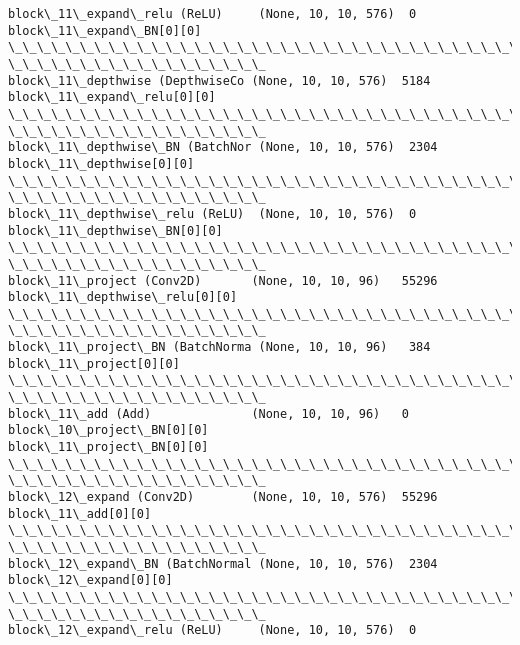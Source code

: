 \documentclass[11pt]{article}
\begin{document}
\begin{Verbatim}[commandchars=\\\{\}]
block\_11\_expand\_relu (ReLU)     (None, 10, 10, 576)  0
block\_11\_expand\_BN[0][0]
\_\_\_\_\_\_\_\_\_\_\_\_\_\_\_\_\_\_\_\_\_\_\_\_\_\_\_\_\_\_\_\_\_\_\_\_\_\_\_\_\_\_\_\_\_\_\_\_\_\_\_\_\_\_\_\_\_\_\_\_\_\_\_\_\_\_\_\_\_\_\_\_\_\_\_\_\_\_\_\_
\_\_\_\_\_\_\_\_\_\_\_\_\_\_\_\_\_\_
block\_11\_depthwise (DepthwiseCo (None, 10, 10, 576)  5184
block\_11\_expand\_relu[0][0]
\_\_\_\_\_\_\_\_\_\_\_\_\_\_\_\_\_\_\_\_\_\_\_\_\_\_\_\_\_\_\_\_\_\_\_\_\_\_\_\_\_\_\_\_\_\_\_\_\_\_\_\_\_\_\_\_\_\_\_\_\_\_\_\_\_\_\_\_\_\_\_\_\_\_\_\_\_\_\_\_
\_\_\_\_\_\_\_\_\_\_\_\_\_\_\_\_\_\_
block\_11\_depthwise\_BN (BatchNor (None, 10, 10, 576)  2304
block\_11\_depthwise[0][0]
\_\_\_\_\_\_\_\_\_\_\_\_\_\_\_\_\_\_\_\_\_\_\_\_\_\_\_\_\_\_\_\_\_\_\_\_\_\_\_\_\_\_\_\_\_\_\_\_\_\_\_\_\_\_\_\_\_\_\_\_\_\_\_\_\_\_\_\_\_\_\_\_\_\_\_\_\_\_\_\_
\_\_\_\_\_\_\_\_\_\_\_\_\_\_\_\_\_\_
block\_11\_depthwise\_relu (ReLU)  (None, 10, 10, 576)  0
block\_11\_depthwise\_BN[0][0]
\_\_\_\_\_\_\_\_\_\_\_\_\_\_\_\_\_\_\_\_\_\_\_\_\_\_\_\_\_\_\_\_\_\_\_\_\_\_\_\_\_\_\_\_\_\_\_\_\_\_\_\_\_\_\_\_\_\_\_\_\_\_\_\_\_\_\_\_\_\_\_\_\_\_\_\_\_\_\_\_
\_\_\_\_\_\_\_\_\_\_\_\_\_\_\_\_\_\_
block\_11\_project (Conv2D)       (None, 10, 10, 96)   55296
block\_11\_depthwise\_relu[0][0]
\_\_\_\_\_\_\_\_\_\_\_\_\_\_\_\_\_\_\_\_\_\_\_\_\_\_\_\_\_\_\_\_\_\_\_\_\_\_\_\_\_\_\_\_\_\_\_\_\_\_\_\_\_\_\_\_\_\_\_\_\_\_\_\_\_\_\_\_\_\_\_\_\_\_\_\_\_\_\_\_
\_\_\_\_\_\_\_\_\_\_\_\_\_\_\_\_\_\_
block\_11\_project\_BN (BatchNorma (None, 10, 10, 96)   384
block\_11\_project[0][0]
\_\_\_\_\_\_\_\_\_\_\_\_\_\_\_\_\_\_\_\_\_\_\_\_\_\_\_\_\_\_\_\_\_\_\_\_\_\_\_\_\_\_\_\_\_\_\_\_\_\_\_\_\_\_\_\_\_\_\_\_\_\_\_\_\_\_\_\_\_\_\_\_\_\_\_\_\_\_\_\_
\_\_\_\_\_\_\_\_\_\_\_\_\_\_\_\_\_\_
block\_11\_add (Add)              (None, 10, 10, 96)   0
block\_10\_project\_BN[0][0]
block\_11\_project\_BN[0][0]
\_\_\_\_\_\_\_\_\_\_\_\_\_\_\_\_\_\_\_\_\_\_\_\_\_\_\_\_\_\_\_\_\_\_\_\_\_\_\_\_\_\_\_\_\_\_\_\_\_\_\_\_\_\_\_\_\_\_\_\_\_\_\_\_\_\_\_\_\_\_\_\_\_\_\_\_\_\_\_\_
\_\_\_\_\_\_\_\_\_\_\_\_\_\_\_\_\_\_
block\_12\_expand (Conv2D)        (None, 10, 10, 576)  55296
block\_11\_add[0][0]
\_\_\_\_\_\_\_\_\_\_\_\_\_\_\_\_\_\_\_\_\_\_\_\_\_\_\_\_\_\_\_\_\_\_\_\_\_\_\_\_\_\_\_\_\_\_\_\_\_\_\_\_\_\_\_\_\_\_\_\_\_\_\_\_\_\_\_\_\_\_\_\_\_\_\_\_\_\_\_\_
\_\_\_\_\_\_\_\_\_\_\_\_\_\_\_\_\_\_
block\_12\_expand\_BN (BatchNormal (None, 10, 10, 576)  2304
block\_12\_expand[0][0]
\_\_\_\_\_\_\_\_\_\_\_\_\_\_\_\_\_\_\_\_\_\_\_\_\_\_\_\_\_\_\_\_\_\_\_\_\_\_\_\_\_\_\_\_\_\_\_\_\_\_\_\_\_\_\_\_\_\_\_\_\_\_\_\_\_\_\_\_\_\_\_\_\_\_\_\_\_\_\_\_
\_\_\_\_\_\_\_\_\_\_\_\_\_\_\_\_\_\_
block\_12\_expand\_relu (ReLU)     (None, 10, 10, 576)  0

\end{Verbatim}
\end{document}
